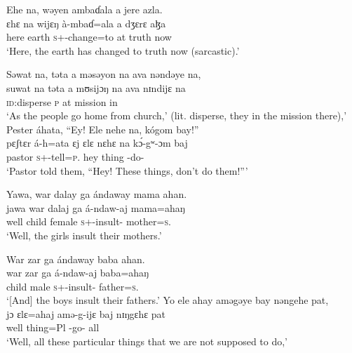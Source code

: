 \ea Ehe  na,  wəyen  ambaɗala  a  jere  azla.\\
 \gll ɛhɛ     na wijɛŋ   à-mbaɗ=ala   a   dʒɛrɛ   aɮa\\
 here    {\PSP}  earth  \textsc{s}+{\PFV}-change=to  at  truth  now\\
 \glt ‘Here, the earth has changed to truth now (sarcastic).’
 \z

\ea Səwat  na,   təta  a  məsəyon  na  ava  nəndəye  na,\\  
 \gll suwat  na təta  a  mʊsijɔŋ   na   ava  nɪndijɛ  na\\
 \textsc{id}:disperse  {\PSP}  \textsc{p}      at   mission  {\PSP}  in  {\DEM}  {\PSP}  \\
 \glt ‘As the people go home from church,’ (lit. disperse, they in the mission there),’ \\
 
 \medskip
 Pester  áhata,  “Ey!  Ele  nehe  na,  kógom  bay!”  \\
\gll pɛʃtɛr  á-h=ata   ɛj     ɛlɛ      nɛhɛ   na k\'ɔ-gʷ-ɔm baj\\
 pastor  \textsc{s}+{\IFV}-tell=\textsc{p}.{\IO}  hey  thing  {\DEM}  {\PSP} {\IFV}-do-{\twoP}  {\NEG}\\
 \glt ‘Pastor told them, “Hey! These things, don’t do them!”’
 \z

\ea Yawa,  war  dalay  ga ándaway  mama  ahan.\\
 \gll jawa   war   dalaj  ga  á-ndaw-aj   mama=ahaŋ\\
 well    child  female  {\ADJ}  \textsc{s}+{\IFV}-insult{}-{\CL}  mother=\textsc{s}.{\POSS}\\
 \glt ‘Well, the girls insult their mothers.’ 
 \z

\ea War  zar  ga  ándaway  baba  ahan.\\
 \gll war     zar  ga  á-ndaw-aj   baba=ahaŋ\\
 child  male  {\ADJ}  \textsc{s}+{\IFV}-insult{}-{\CL}  father=\textsc{s}.{\POSS}\\
 \glt ‘[And] the boys insult their fathers.’ 
 \z
\clearpage
\ea Yo  ele  ahay  aməgəye  bay  nəngehe    pat,\\
 \gll jɔ      ɛlɛ=ahaj  amə-g-ijɛ   baj      nɪŋgɛhɛ    pat\\
 well   thing=Pl      {\DEP}-go-{\CL}    {\NEG}    {\DEM}     all\\
 \glt ‘Well, all these particular things that we are not supposed to do,’\\
 

